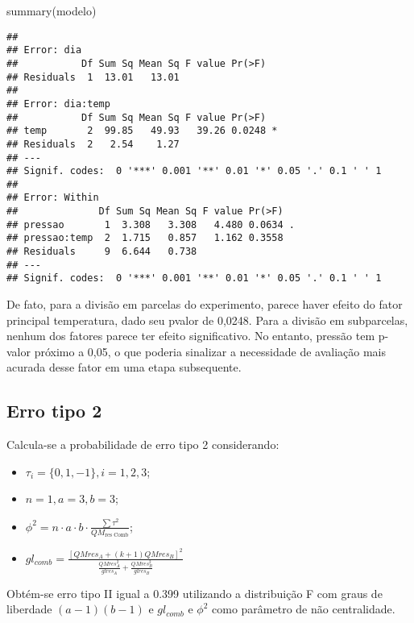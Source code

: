 \documentclass[
]{article}
\newenvironment{Shaded}{\begin{snugshade}}{\end{snugshade}}
\newcommand{\FunctionTok}[1]{\textcolor[rgb]{0.00,0.00,0.00}{#1}}
\newcommand{\NormalTok}[1]{#1}
\providecommand{\tightlist}{%
  \setlength{\itemsep}{0pt}\setlength{\parskip}{0pt}}
\begin{document}
\begin{Shaded}
\begin{Highlighting}[]
\FunctionTok{summary}\NormalTok{(modelo)}
\end{Highlighting}
\end{Shaded}

\begin{verbatim}
## 
## Error: dia
##           Df Sum Sq Mean Sq F value Pr(>F)
## Residuals  1  13.01   13.01               
## 
## Error: dia:temp
##           Df Sum Sq Mean Sq F value Pr(>F)  
## temp       2  99.85   49.93   39.26 0.0248 *
## Residuals  2   2.54    1.27                 
## ---
## Signif. codes:  0 '***' 0.001 '**' 0.01 '*' 0.05 '.' 0.1 ' ' 1
## 
## Error: Within
##              Df Sum Sq Mean Sq F value Pr(>F)  
## pressao       1  3.308   3.308   4.480 0.0634 .
## pressao:temp  2  1.715   0.857   1.162 0.3558  
## Residuals     9  6.644   0.738                 
## ---
## Signif. codes:  0 '***' 0.001 '**' 0.01 '*' 0.05 '.' 0.1 ' ' 1
\end{verbatim}

De fato, para a divisão em parcelas do experimento, parece haver efeito
do fator principal temperatura, dado seu pvalor de 0,0248. Para a
divisão em subparcelas, nenhum dos fatores parece ter efeito
significativo. No entanto, pressão tem p-valor próximo a 0,05, o que
poderia sinalizar a necessidade de avaliação mais acurada desse fator em
uma etapa subsequente.

\hypertarget{erro-tipo-2}{%
\subsection{Erro tipo 2}\label{erro-tipo-2}}

Calcula-se a probabilidade de erro tipo 2 considerando:

\begin{itemize}
\tightlist
\item
  \(\tau_i = \{0,1,-1\}, i = 1, 2, 3\);
\item
  \(n = 1, a = 3, b = 3\);
\item
  \(\phi^2 = n\cdot a\cdot b \cdot \frac{\sum \tau^2}{QM_\text{res Comb}}\);
\item
  \(gl_{comb} = \frac{[QMres_A + (k+1)QMres_B]^2}{\frac{QMres_A^2}{gl res_A} + \frac{QMres_B^2}{gl res_B}}\)
\end{itemize}

Obtém-se erro tipo II igual a 0.399 utilizando a distribuição F com
graus de liberdade \((a-1)(b-1)\) e \(gl_{comb}\) e \(\phi^2\) como
parâmetro de não centralidade.
\end{document}
